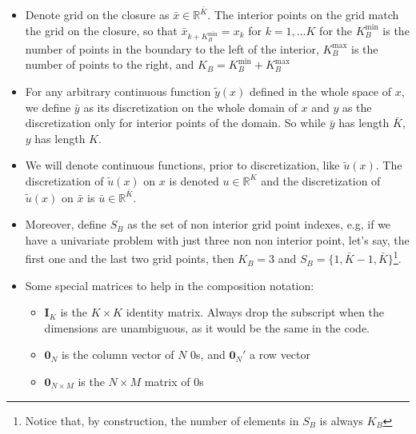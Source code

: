 \documentclass[11pt]{article}
\newcommand{\R}{\ensuremath{\mathbb{R}}}
\begin{document}
\begin{itemize}
		\item Denote grid on the closure as $\bar{x} \in \R^{\bar{K}}$.  The interior points on the grid match the grid on the closure, so that $\bar{x}_{k+K^{\min}_B} = x_{k}$ for $k = 1, \ldots K$ for the $K^{\min}_B$ is the number of points in the boundary to the left of the interior, $K^{\max}_B$ is the number of points to the right, and $K_B = K^{\min}_B + K^{\max}_B$
		\item For any arbitrary continuous function $\tilde{y}(x)$ defined in the whole space of $x$, we define $\bar{y}$ as its discretization on the whole domain of $x$ and $y$ as the discretization only for interior points of the domain. So while $\bar{y}$ has length $\bar{K}$, $y$ has length $K$.
		\item We will denote continuous functions, prior to discretization, like $\tilde{u}(x)$.  The discretization of $\tilde{u}(x)$ on $x$ is denoted $u \in \R^K$ and the discretization of $\tilde{u}(x)$ on $\bar{x}$ is $\bar{u} \in \R^{\bar{K}}$.
		\item Moreover, define $S_B$ as the set of non interior grid point indexes, e.g, if we have a univariate problem with just three non non interior point, let's say, the first one and the last two grid points, then $K_B = 3$ and $S_B = \{1,\bar{K}-1,\bar{K}\}$\footnote{Notice that, by construction, the number of elements in $S_B$ is always $K_B$}.
		\item Some special matrices to help in the composition notation:
		\begin{itemize}
			\item $\mathbf{I}_K$ is the $K\times K$ identity matrix.  Always drop the subscript when the dimensions are unambiguous, as it would be the same in the code.
			\item $\mathbf{0}_N$ is the column vector of $N$ $0$s, and $\mathbf{0}_N'$ a row vector
			\item $\mathbf{0}_{N\times M}$ is the $N\times M$ matrix of $0$s
		\end{itemize}
	\end{itemize}
\end{document}
